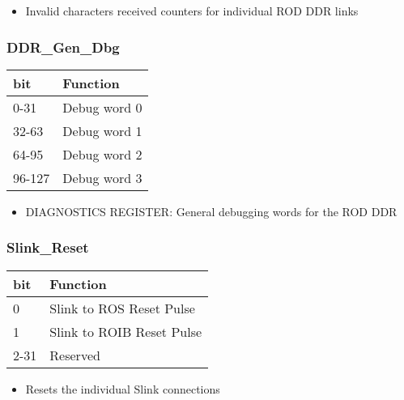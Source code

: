 \begin{itemize}
\item Invalid characters received counters for individual ROD DDR links
\end{itemize}



\subsubsection{DDR\_Gen\_Dbg}

\begin {table}[H]
\begin{center}
\begin{tabular}{|l|l|}
\hline
\textbf{bit} & \textbf{Function} \\
\hline
0-31 & Debug word 0 \\
\hline
32-63 & Debug word 1 \\
\hline
64-95 & Debug word 2 \\
\hline
96-127 & Debug word 3 \\
\hline
\end{tabular}
\end{center}
\end{table}


\begin{itemize}
\item DIAGNOSTICS REGISTER: General debugging words for the ROD DDR
\end{itemize}




\subsubsection{Slink\_Reset}

\begin {table}[H]
\begin{center}
\begin{tabular}{|l|l|}
\hline
\textbf{bit} & \textbf{Function} \\
\hline
0 & Slink to ROS Reset Pulse \\
\hline
1 & Slink to ROIB Reset Pulse \\
\hline
2-31 & Reserved \\
\hline
\end{tabular}
\end{center}
\end{table}


\begin{itemize}
\item Resets the individual Slink connections
\end{itemize}



